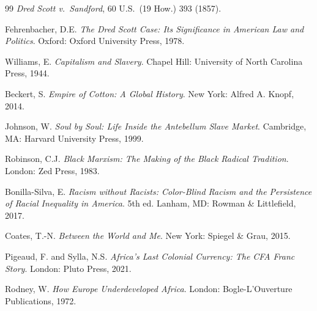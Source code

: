 \documentclass[12pt]{article}
\begin{document}
\begin{thebibliography}{99}
\textit{Dred Scott v.\ Sandford}, 60 U.S.\ (19 How.) 393 (1857).

Fehrenbacher, D.E. \textit{The Dred Scott Case: Its Significance in American Law and Politics}. Oxford: Oxford University Press, 1978.


Williams, E. \textit{Capitalism and Slavery}. Chapel Hill: University of North Carolina Press, 1944.

Beckert, S. \textit{Empire of Cotton: A Global History}. New York: Alfred A. Knopf, 2014.

Johnson, W. \textit{Soul by Soul: Life Inside the Antebellum Slave Market}. Cambridge, MA: Harvard University Press, 1999.


Robinson, C.J. \textit{Black Marxism: The Making of the Black Radical Tradition}. London: Zed Press, 1983.

Bonilla-Silva, E. \textit{Racism without Racists: Color-Blind Racism and the Persistence of Racial Inequality in America}. 5th ed. Lanham, MD: Rowman \& Littlefield, 2017.

Coates, T.-N. \textit{Between the World and Me}. New York: Spiegel \& Grau, 2015.


Pigeaud, F. and Sylla, N.S. \textit{Africa's Last Colonial Currency: The CFA Franc Story}. London: Pluto Press, 2021.

Rodney, W. \textit{How Europe Underdeveloped Africa}. London: Bogle-L'Ouverture Publications, 1972.

\end{thebibliography}
\end{document}
